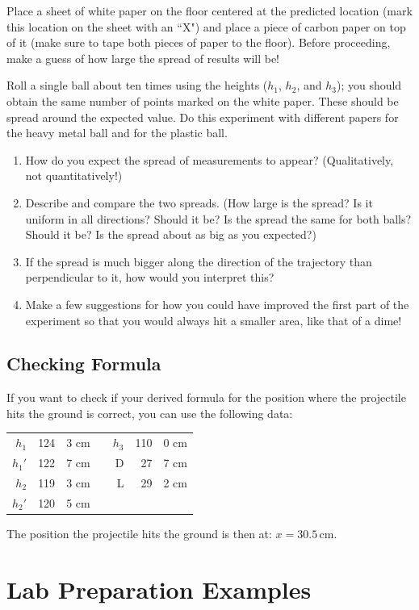 Place a sheet of white paper on the floor centered at the predicted location (mark this location on the sheet with an ``X") and place a piece of carbon paper on top of it (make sure to tape both pieces of paper to the floor). Before proceeding, make a guess of how large the spread of results will be!\myskip

Roll a single ball about ten times using the heights ($h_1$, $h_2$, and $h_3$); you should obtain the same number of points marked on the white paper. These should be spread around the expected value. Do this experiment with different papers for the heavy metal ball and for the plastic ball.
\begin{enumerate}
    \item How do you expect the spread of measurements to appear? (Qualitatively, not quantitatively!)
    \item Describe and compare the two spreads. (How large is the spread?  Is it uniform in all directions? Should it be?  Is the spread the same for both balls? Should it be? Is the spread about as big as you expected?)
    \item If the spread is much bigger along the direction of the trajectory than perpendicular to it, how would you interpret this?
    \item Make a few suggestions for how you could have improved the first part of the experiment so that you would always hit a smaller area, like that of a dime!
\end{enumerate}

\subsection{Checking Formula}
If you want to check if your derived formula for the position where the projectile hits the ground is correct, you can use the following data:
\begin{table}[h]
  \centering
  \begin{tabular}[h]{r@{=}r@{.}lcr@{=}r@{.}l}
    $h_{1}$&124&3 cm&&$h_{3}$&110&0 cm\\
    $h_{1}'$&122&7 cm&&D&27&7 cm\\
    $h_{2}$&119&3 cm&&L&29&2 cm\\
    $h_{2}'$&120&5 cm
  \end{tabular}
\end{table}
The position the projectile hits the ground is then at: $x  =  30.5\, \textrm{cm}$.

\section{Lab Preparation Examples}

